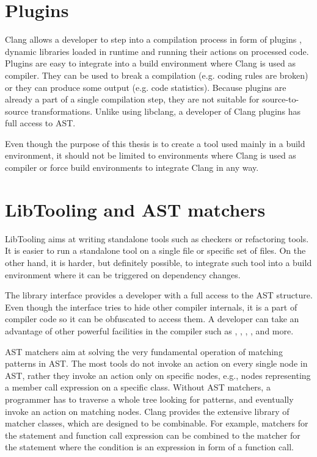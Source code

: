 \section{Plugins}
Clang allows a developer to step into a compilation process in form of plugins \cite{clang-plugins}, dynamic libraries loaded in runtime and running their actions on processed code. Plugins are easy to integrate into a build environment where Clang is used as compiler. They can be used to break a compilation (e.g. coding rules are broken) or they can produce some output (e.g. code statistics). Because plugins are already a part of a single compilation step, they are not suitable for source-to-source transformations. Unlike using libclang, a developer of Clang plugins has full access to AST.

Even though the purpose of this thesis is to create a tool used mainly in a build environment, it should not be limited to environments where Clang is used as compiler or force build environments to integrate Clang in any way.

\section{LibTooling and AST matchers}
LibTooling \cite{clang-libtooling} aims at writing standalone tools such as checkers or refactoring tools. It is easier to run a standalone tool on a single file or specific set of files. On the other hand, it is harder, but definitely possible, to integrate such tool into a build environment where it can be triggered on dependency changes.

The library interface provides a developer with a full access to the AST structure. Even though the interface tries to hide other compiler internals, it is a part of compiler code so it can be obfuscated to access them. A developer can take an advantage of other powerful facilities in the compiler such as , , , ,  and more.

AST matchers \cite{clang-matchers} aim at solving the very fundamental operation of matching patterns in AST. The most tools do not invoke an action on every single node in AST, rather they invoke an action only on specific nodes, e.g., nodes representing a member call expression on a specific class. Without AST matchers, a programmer has to traverse a whole tree looking for patterns, and eventually invoke an action on matching nodes. Clang provides the extensive library of matcher classes, which are designed to be combinable. For example, matchers for the  statement and function call expression can be combined to the matcher for the  statement where the condition is an expression in form of a function call.

